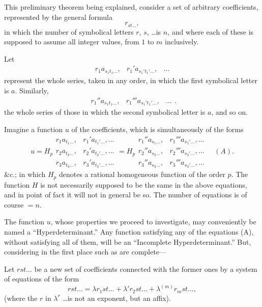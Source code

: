 \documentclass[11pt,a4paper]{book}
\begin{document}
This preliminary theorem being explained, consider a set of arbitrary coefficients,
represented by the general formula
\[
r_{st\ldots}
\tag{6},
\]
in which the number of symbolical letters $r$, $s$, \ldots is $n$, and where each of these is
supposed to assume all integer values, from $1$ to $m$ inclusively.

\newpage
Let
\[
\begin{array}{ccc}
r_1 a_{s_1 t_1 \ldots}, & r_1' a_{s_1' t_1' \ldots}, & \ldots
\end{array}
\tag{7}
\]
represent the whole series, taken in any order, in which the first symbolical letter
is $a$. Similarly,
\[
\begin{array}{ccc}
r_1'' a_{s_1 t_1 \ldots}, & r_1''' a_{s_1' t_1' \ldots}, & \ldots
\end{array}
\tag{8}.
\]
the whole series of those in which the second symbolical letter is $a$, and so on.

Imagine a function $u$ of the coefficients, which is simultaneously of the forms
\[
u = H_p
\begin{array}{cc}
r_1 a_{t_1 \ldots}, & r_1' a_{t_1' \ldots}, \ldots \\
r_2 a_{t_2 \ldots}, & r_2' a_{t_2' \ldots}, \ldots \\
r_3 a_{t_3 \ldots}, & r_3' a_{t_3' \ldots}, \ldots
\end{array}
= H_p
\begin{array}{cc}
r_1'' a_{s_1 \ldots}, & r_1''' a_{s_1' \ldots}, \ldots \\
r_2'' a_{s_2 \ldots}, & r_2''' a_{s_2' \ldots}, \ldots \\
r_3'' a_{s_3 \ldots}, & r_3''' a_{s_3' \ldots}, \ldots
\end{array}
\quad (A).
\]
\&c.; in which $H_p$ denotes a rational homogeneous function of the order $p$. The
function $H$ is not necessarily supposed to be the same in the above equations, and
in point of fact it will not in general be so. The number of equations is of course $=n$.

The function $u$, whose properties we proceed to investigate, may conveniently be
named a ``Hyperdeterminant.'' Any function satisfying any of the equations (A),
without satisfying all of them, will be an ``Incomplete Hyperdeterminant.'' But,
considering in the first place such as are complete---

Let $rst\ldots$ be a new set of coefficients connected with the former ones by a system
of equations of the form
\[
rst\ldots = \lambda r_1 st\ldots + \lambda' r_2 st\ldots + \lambda^{(m)} r_m st\ldots
\tag{9},
\]
(where the $r$ in $\lambda^r$ \ldots is not an exponent, but an affix).
\end{document}
